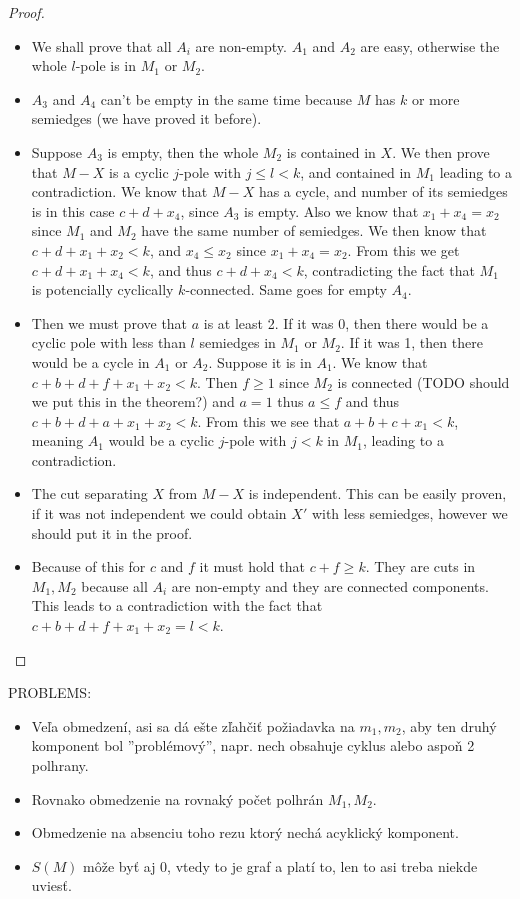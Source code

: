 \documentclass[12pt, twoside]{book}
\begin{document}
\begin{proof}
\begin{itemize}
		\item We shall prove that all $A_i$ are non-empty. $A_1$ and $A_2$ are easy, otherwise the whole $l$-pole is in $M_1$ or $M_2$.
		\item $A_3$ and $A_4$ can't be empty in the same time because $M$ has $k$ or more semiedges (we have proved it before).
		\item Suppose $A_3$ is empty, then the whole $M_2$ is contained in $X$. We then prove that $M-X$ is a cyclic $j$-pole with $j\leq l < k$, and contained in $M_1$ leading to a contradiction. We know that $M-X$ has a cycle, and number of its semiedges is in this case $c+d+x_4$, since $A_3$ is empty. Also we know that $x_1+x_4=x_2$ since $M_1$ and $M_2$ have the same number of semiedges. We then know that $c+d+x_1+x_2<k$, and $x_4\leq x_2$ since $x_1+x_4=x_2$. From this we get $c+d+x_1+x_4<k$, and thus $c+d+x_4<k$, contradicting the fact that $M_1$ is potencially cyclically $k$-connected. Same goes for empty $A_4$.
		\item Then we must prove that $a$ is at least 2. If it was 0, then there would be a cyclic pole with less than $l$ semiedges in $M_1$ or $M_2$. If it was 1, then there would be a cycle in $A_1$ or $A_2$. Suppose it is in $A_1$. We know that $c+b+d+f+x_1+x_2<k$. Then $f\geq 1$ since $M_2$ is connected (TODO should we put this in the theorem?) and $a=1$ thus $a\leq f$ and thus $c+b+d+a+x_1+x_2<k$. From this we see that $a+b+c+x_1<k$, meaning $A_1$ would be a cyclic $j$-pole with $j<k$ in $M_1$, leading to a contradiction.
		\item The cut separating $X$ from $M-X$ is independent. This can be easily proven, if it was not independent we could obtain $X'$ with less semiedges, however we should put it in the proof.
		\item Because of this for $c$ and $f$ it must hold that $c+f\geq k$. They are cuts in $M_1, M_2$ because all $A_i$ are non-empty and they are connected components. This leads to a contradiction with the fact that $c+b+d+f+x_1+x_2=l<k$.
	\end{itemize}
\end{proof}

PROBLEMS:

\begin{itemize}
	\item Veľa obmedzení, asi sa dá ešte zľahčiť požiadavka na $m_1,m_2$, aby ten druhý komponent bol ''problémový'', napr. nech obsahuje cyklus alebo aspoň 2 polhrany.
	\item Rovnako obmedzenie na rovnaký počet polhrán $M_1,M_2$.
	\item Obmedzenie na absenciu toho rezu ktorý nechá acyklický komponent.
	\item $S(M)$ môže byť aj 0, vtedy to je graf a platí to, len to asi treba niekde uviesť.
\end{itemize}
\end{document}
